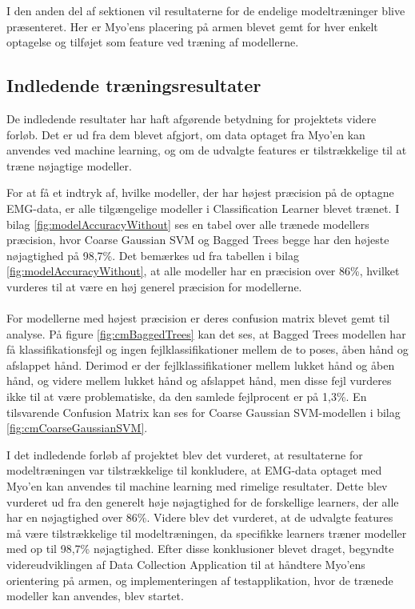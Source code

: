 I den anden del af sektionen vil resultaterne for de endelige modeltræninger blive præsenteret. Her er Myo'ens placering på armen blevet gemt for hver enkelt optagelse og tilføjet som feature ved træning af modellerne.

\subsection{Indledende træningsresultater}
De indledende resultater har haft afgørende betydning for projektets videre forløb. Det er ud fra dem blevet afgjort, om data optaget fra Myo'en kan anvendes ved machine learning, og om de udvalgte features er tilstrækkelige til at træne nøjagtige modeller. 
 
For at få et indtryk af, hvilke modeller, der har højest præcision på de optagne EMG-data, er alle tilgængelige modeller i Classification Learner blevet trænet. I bilag \ref{fig:modelAccuracyWithout} ses en tabel over alle trænede modellers præcision, hvor Coarse Gaussian SVM og Bagged Trees begge har den højeste nøjagtighed på 98,7\%.
Det bemærkes ud fra tabellen i bilag \ref{fig:modelAccuracyWithout}, at alle modeller har en præcision over 86\%, hvilket vurderes til at være en høj generel præcision for modellerne. 
\\\\
For modellerne med højest præcision er deres confusion matrix blevet gemt til analyse. På figure \ref{fig:cmBaggedTrees} kan det ses, at Bagged Trees modellen har få klassifikationsfejl og ingen fejlklassifikationer mellem de to poses, åben hånd og afslappet hånd. Derimod er der fejlklassifikationer mellem lukket hånd og åben hånd, og videre mellem lukket hånd og afslappet hånd, men disse fejl vurderes ikke til at være problematiske, da den samlede fejlprocent er på 1,3\%. En tilsvarende Confusion Matrix kan ses for Coarse Gaussian SVM-modellen i bilag \ref{fig:cmCoarseGaussianSVM}. 
 
 I det indledende forløb af projektet blev det vurderet, at resultaterne for modeltræningen var tilstrækkelige til konkludere, at EMG-data optaget med Myo'en kan anvendes til machine learning med rimelige resultater. Dette blev vurderet ud fra den generelt høje nøjagtighed for de forskellige learners, der alle har en nøjagtighed over 86\%. Videre blev det vurderet, at de udvalgte features må være tilstrækkelige til modeltræningen, da specifikke learners træner modeller med op til 98,7\% nøjagtighed. Efter disse konklusioner blevet draget, begyndte videreudviklingen af Data Collection Application til at håndtere Myo'ens orientering på armen, og implementeringen af testapplikation, hvor de trænede modeller kan anvendes, blev startet.

